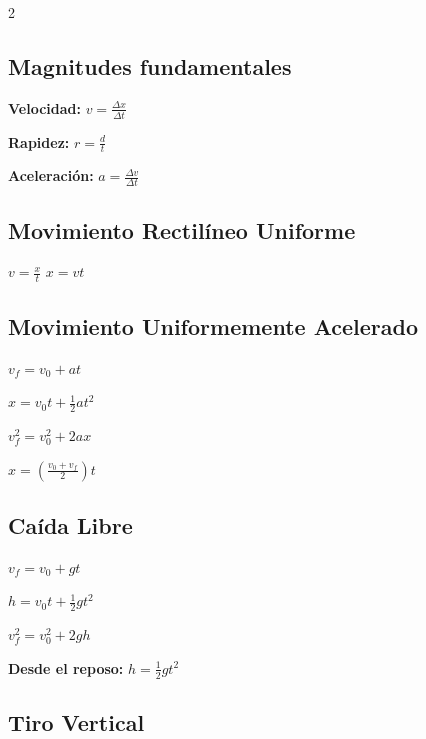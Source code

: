 \begin{multicols}{2}

\subsection{Magnitudes fundamentales}

\begin{ecuacion}
\textbf{Velocidad:}
$v = \frac{\Delta x}{\Delta t}$

\textbf{Rapidez:}
$r = \frac{d}{t}$

\textbf{Aceleración:}
$a = \frac{\Delta v}{\Delta t}$
\end{ecuacion}

\subsection{Movimiento Rectilíneo Uniforme}

\begin{ecuacion}
$v = \frac{x}{t}$
$x = vt$
\end{ecuacion}

\subsection{Movimiento Uniformemente Acelerado}

\begin{ecuacion}
$v_f = v_0 + at$

$x = v_0 t + \frac{1}{2}at^2$

$v_f^2 = v_0^2 + 2ax$

$x = \left(\frac{v_0 + v_f}{2}\right) t$
\end{ecuacion}

\subsection{Caída Libre}

\begin{ecuacion}
$v_f = v_0 + gt$

$h = v_0 t + \frac{1}{2}gt^2$

$v_f^2 = v_0^2 + 2gh$

\textbf{Desde el reposo:}
$h = \frac{1}{2}gt^2$
\end{ecuacion}

\columnbreak

\subsection{Tiro Vertical}


\end{multicols}
